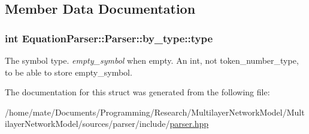 \subsection{Member Data Documentation}
\subsubsection[{\texorpdfstring{type}{type}}]{\setlength{\rightskip}{0pt plus 5cm}int Equation\+Parser\+::\+Parser\+::by\+\_\+type\+::type}\hypertarget{structEquationParser_1_1Parser_1_1by__type_af116c7ee695735c0b9a2a6e74efa25f0}{}\label{structEquationParser_1_1Parser_1_1by__type_af116c7ee695735c0b9a2a6e74efa25f0}
The symbol type. {\itshape empty\+\_\+symbol} when empty. An int, not token\+\_\+number\+\_\+type, to be able to store empty\+\_\+symbol. 

The documentation for this struct was generated from the following file\+:\begin{DoxyCompactItemize}
\item 
/home/mate/\+Documents/\+Programming/\+Research/\+Multilayer\+Network\+Model/\+Multilayer\+Network\+Model/sources/parser/include/\hyperlink{parser_8hpp}{parser.\+hpp}\end{DoxyCompactItemize}
